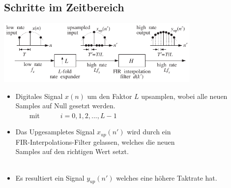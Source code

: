 	\subsection{Schritte im Zeitbereich}
		\hspace*{1cm}\includegraphics[width = 0.75\textwidth]{pic/Upsampler.pdf}
		\begin{itemize}
		  \item Digitales Signal $x(n)$ um den Faktor $L$ upsamplen, wobei alle neuen Samples auf Null gesetzt werden.\\[0.2cm]
		  $\qquad$mit$\qquad$$\quad i=0,1,2,...,L-1$\\
		  \item Das Upgesampletes Signal $x_{up}(n')$ wird durch ein\\FIR-Interpolations-Filter gelassen, welches die neuen\\ Samples auf den richtigen Wert setzt.\\[-1.35cm]
		  \hspace*{10.2cm}\\[-0.1cm]
		  \item Es resultiert ein Signal $y_{up}(n')$ welches eine höhere Taktrate hat.$\qquad$
		  \\[-0.4cm]
		\end{itemize}
		
